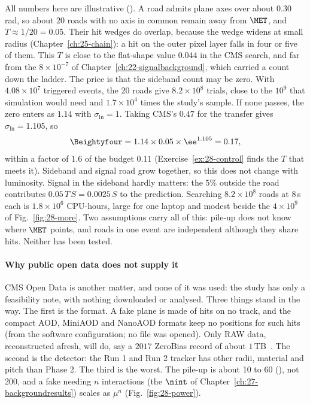 \begin{example}\label{exa:28-sideband}
All numbers here are illustrative (\EST). A road admits plane axes over about $0.30$\,rad, so about $20$ roads with no axis in common remain away from $\MET$, and $T\approx1/20=0.05$. Their hit wedges do overlap, because the wedge widens at small radius (Chapter~\ref{ch:25-chain}): a hit on the outer pixel layer falls in four or five of them. This $T$ is close to the flat-shape value $0.044$ in the CMS search, and far from the $8\times10^{-7}$ of Chapter~\ref{ch:22-signalbackground}, which carried a count down the ladder. The price is that the sideband count may be zero. With $4.08\times10^7$ triggered events, the $20$ roads give $8.2\times10^8$ trials, close to the $10^9$ that simulation would need and $1.7\times10^4$ times the study's sample. If none passes, the zero enters as $1.14$ with $\sigma_{\ln}=1$. Taking CMS's $0.47$ for the transfer gives $\sigma_{\ln}=1.105$, so
\[
  \Beightyfour=1.14\times0.05\times\ee^{1.105}=0.17 ,
\]
within a factor of $1.6$ of the budget $0.11$ (Exercise~\ref{ex:28-control} finds the $T$ that meets it). Sideband and signal road grow together, so this does not change with luminosity. Signal in the sideband hardly matters: the $5\%$ outside the road contributes $0.05\,T\,S=0.0025\,S$ to the prediction. Searching $8.2\times10^8$ roads at $8$\,s each is $1.8\times10^6$ CPU-hours, large for one laptop and modest beside the $4\times10^9$ of Fig.~\ref{fig:28-more}. Two assumptions carry all of this: pile-up does not know where $\MET$ points, and roads in one event are independent although they share hits. Neither has been tested.
\end{example}

\paragraph{Why public open data does not supply it}
CMS Open Data is another matter, and none of it was used: the study has only a feasibility note, with nothing downloaded or analysed. Three things stand in the way. The first is the format. A fake plane is made of hits on no track, and the compact AOD, MiniAOD and NanoAOD formats keep no positions for such hits (from the software configuration; no file was opened). Only RAW data, reconstructed afresh, will do, say a $2017$ ZeroBias record of about $1$\,TB~\cite{CMS:ZeroBias2017E}. The second is the detector: the Run 1 and Run 2 tracker has other radii, material and pitch than Phase 2. The third is the worst. The pile-up is about 10 to 60 (\UNV), not 200, and a fake needing $n$ interactions (the $\nint$ of Chapter~\ref{ch:27-backgroundresults}) scales as $\mu^n$ (Fig.~\ref{fig:28-power}).

